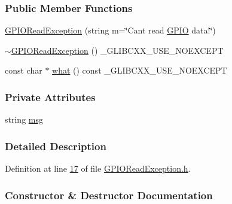 \subsubsection*{Public Member Functions}
\begin{DoxyCompactItemize}
\item 
\hyperlink{class_hardware_1_1_exception_1_1_g_p_i_o_read_exception_a689a2d0cefc6eb5528ad6e7200fbf5f5}{G\+P\+I\+O\+Read\+Exception} (string m=\char`\"{}Can\textquotesingle{}t read \hyperlink{class_hardware_1_1_g_p_i_o}{G\+P\+I\+O} data!\char`\"{})
\item 
\hyperlink{class_hardware_1_1_exception_1_1_g_p_i_o_read_exception_a97a5da2dc97609b2168a53f52589a0fb}{$\sim$\+G\+P\+I\+O\+Read\+Exception} () \+\_\+\+G\+L\+I\+B\+C\+X\+X\+\_\+\+U\+S\+E\+\_\+\+N\+O\+E\+X\+C\+E\+P\+T
\item 
const char $\ast$ \hyperlink{class_hardware_1_1_exception_1_1_g_p_i_o_read_exception_a45c94f4cf40537716cf7c0acfe3ebe29}{what} () const \+\_\+\+G\+L\+I\+B\+C\+X\+X\+\_\+\+U\+S\+E\+\_\+\+N\+O\+E\+X\+C\+E\+P\+T
\end{DoxyCompactItemize}
\subsubsection*{Private Attributes}
\begin{DoxyCompactItemize}
\item 
string \hyperlink{class_hardware_1_1_exception_1_1_g_p_i_o_read_exception_a51fe12853bc4ee2ef0f6cabd117b844e}{msg}
\end{DoxyCompactItemize}


\subsubsection{Detailed Description}


Definition at line \hyperlink{_g_p_i_o_read_exception_8h_source_l00017}{17} of file \hyperlink{_g_p_i_o_read_exception_8h_source}{G\+P\+I\+O\+Read\+Exception.\+h}.



\subsubsection{Constructor \& Destructor Documentation}
\hypertarget{class_hardware_1_1_exception_1_1_g_p_i_o_read_exception_a689a2d0cefc6eb5528ad6e7200fbf5f5}{}
